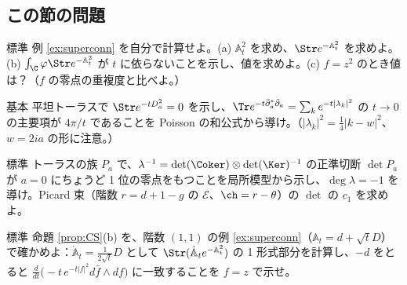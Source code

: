 \subsection*{この節の問題}
\begin{prob}{標準}\label{p:superconn}
例 \ref{ex:superconn} を自分で計算せよ。(a) $\mathbb A_t^2$ を求め、$\Str e^{-\mathbb A_t^2}$ を求めよ。(b) $\int_{\C}\varphi\Str e^{-\mathbb A_t^2}$ が $t$ に依らないことを示し、値を求めよ。(c) $f=z^2$ のとき値は？（$f$ の零点の重複度と比べよ。）
\end{prob}
\begin{prob}{基本}\label{p:heattorus}
平坦トーラスで $\Str e^{-tD_a^2}=0$ を示し、$\Tr e^{-t\bar\partial_a^*\bar\partial_a}=\sum_ke^{-t|\lambda_k|^2}$ の $t\to0$ の主要項が $4\pi/t$ であることを Poisson の和公式から導け。（$|\lambda_k|^2=\frac14|k-w|^2$、$w=2ia$ の形に注意。）
\end{prob}
\begin{prob}{標準}\label{p:detline}
トーラスの族 $P_a$ で、$\lambda^{-1}=\det(\Coker)\otimes\det(\Ker)^{-1}$ の正準切断 $\det P_a$ が $a=0$ にちょうど 1 位の零点をもつことを局所模型から示し、$\deg\lambda=-1$ を導け。Picard 束（階数 $r=d+1-g$ の $\mathcal E$、$\ch=r-\theta$）の $\det$ の $c_1$ を求めよ。
\end{prob}
\begin{prob}{標準}\label{p:CStransg}
命題 \ref{prop:CS}(b) を、階数 $(1,1)$ の例 \ref{ex:superconn}（$\mathbb A_t=d+\sqrt tD$）で確かめよ：$\dot{\mathbb A}_t=\frac1{2\sqrt t}D$ として $\Str(\dot{\mathbb A}_te^{-\mathbb A_t^2})$ の 1 形式部分を計算し、$-d$ をとると $\frac d{dt}\bigl(-t\,e^{-t|f|^2}d\bar f\wedge df\bigr)$ に一致することを $f=z$ で示せ。
\end{prob}
